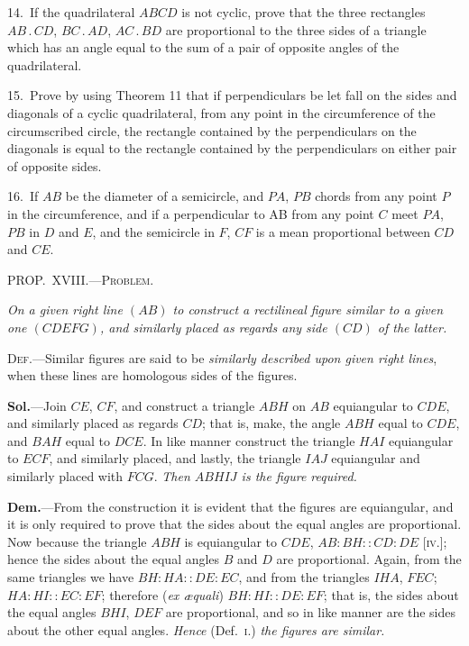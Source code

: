 \documentclass[oneside]{book}
\newcommand\mypropl[2]{
\bigskip\Needspace*{4\baselineskip}\begin{center}\textsc{#1}\end{center}
\hspace{\parindent}\emph{#2}\par\medskip
}
\newcommand\imgcent[2]{
\begin{center}
\end{center}
}
\begin{document}
\begin{footnotesize}
14.~If the quadrilateral $ABCD$ is not cyclic, prove that the
three rectangles $AB\,.\,CD$, $BC\,.\,AD$, $AC\,.\,BD$ are proportional to
the three sides of a triangle which has an angle equal to the sum
of a pair of opposite angles of the quadrilateral.

15.~Prove by using Theorem 11 that if perpendiculars be let
fall on the sides and diagonals of a cyclic quadrilateral, from any
point in the circumference of the circumscribed circle, the rectangle
contained by the perpendiculars on the diagonals is equal
to the rectangle contained by the perpendiculars on either pair of
opposite sides.

16.~If $AB$ be the diameter of a semicircle, and $PA$, $PB$ chords
from any point $P$ in the circumference, and if a perpendicular to
AB from any point $C$ meet $PA$, $PB$ in $D$ and $E$, and the semicircle
in $F$, $CF$ is a mean proportional between $CD$ and $CE$.
\par\end{footnotesize}

\mypropl{PROP\@.~XVIII\@.---Problem.}{On a given right line $(AB)$ to construct a rectilineal
figure similar to a given one $(CDEFG)$, and similarly
placed as regards any side $(CD)$ of the latter.}

\textsc{Def.}---Similar figures are said to be \emph{similarly described
upon given right lines}, when these lines are homologous
sides of the figures.

\imgcent{270}{f195}


\textbf{Sol.}---Join $CE$, $CF$, and construct a triangle $ABH$
on $AB$ equiangular to $CDE$, and similarly placed as
regards $CD$; that is, make, the angle $ABH$ equal to
$CDE$, and $BAH$ equal to $DCE$. In like manner construct
the triangle $HAI$ equiangular to $ECF$, and similarly
placed, and lastly, the triangle $IAJ$ equiangular
and similarly placed with $FCG$. \emph{Then $ABHIJ$ is the
figure required.}

\textbf{Dem.}---From the construction it is\label{isis} evident that the
figures are equiangular, and it is only required to prove
that the sides about the equal angles are proportional.
Now because the triangle $ABH$ is equiangular to $CDE$,
$AB : BH :: CD : DE$ [\textsc{iv.}]; hence the sides about the
equal angles $B$ and $D$ are proportional. Again, from
the same triangles we have $BH : HA :: DE : EC$, and
from the triangles $IHA$, $FEC$; $HA : HI :: EC : EF$;
therefore (\emph{ex {\ae}quali}) $BH : HI :: DE : EF$; that is, the
sides about the equal angles $BHI$, $DEF$ are proportional,
and so in like manner are the sides about the
other equal angles. \emph{Hence} (Def.~\textsc{i.}) \emph{the figures are
similar.}
\end{document}
